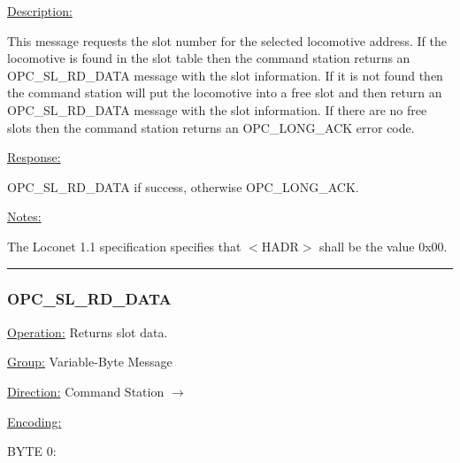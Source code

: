 \underline{Description:}

This message requests the slot number for the selected locomotive address. If the locomotive is found in the slot table then the command station returns an OPC\_SL\_RD\_DATA message with the slot information. If it is not found then the command station will put the locomotive into a free slot and then return an OPC\_SL\_RD\_DATA message with the slot information. If there are no free slots then the command station returns an OPC\_LONG\_ACK error code.

\underline{Response:} 

OPC\_SL\_RD\_DATA if success, otherwise OPC\_LONG\_ACK.

\underline{Notes:} 

The Loconet 1.1 specification specifies that $<$HADR$>$ shall be the value 0x00.

\rule{15.1cm}{0.4pt}
\subsubsection{OPC\_SL\_RD\_DATA}
\underline{Operation:} Returns slot data.

\underline{Group:} \hspace{0.5cm} Variable-Byte Message

\underline{Direction:} \hspace{0.05cm} Command Station $\rightarrow$ 

\underline{Encoding:} 

BYTE 0:

